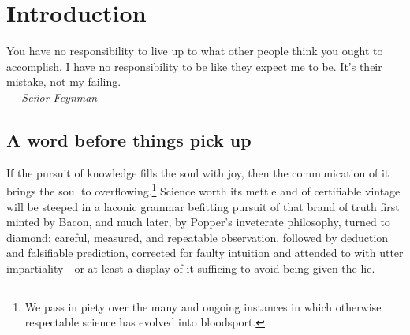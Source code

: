 
\chapter{Introduction}
\label{chp:1}

\begin{flushright}
  \begin{minipage}[]{0.5\linewidth}
    \begin{flushright}
      You have no responsibility to live up to what other people think you ought to accomplish. I have no responsibility to be like
      they expect me to be. It's their mistake, not my failing.    \\{\small \emph{--- Se\~{n}or Feynman} }
    \end{flushright}
  \end{minipage}
\end{flushright}
\vspace{\baselineskip}

\section{A word before things pick up}

If the pursuit of knowledge fills the soul with joy, then the
communication of it brings the soul to overflowing.\footnote{We pass
  in piety over the many and ongoing instances in which otherwise
  respectable science has evolved into bloodsport.} Science worth its
mettle and of certifiable vintage will be steeped in a laconic grammar
befitting pursuit of that brand of truth first minted by Bacon, and
much later, by Popper's inveterate philosophy, turned to diamond:
careful, measured, and repeatable observation, followed by deduction
and falsifiable prediction, corrected for faulty intuition and
attended to with utter impartiality---or at least a display of it
sufficing to avoid being given the lie.

